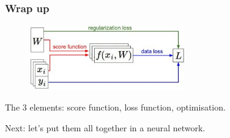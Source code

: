 \begin{frame}
	\frametitle{Wrap up}

	\centering
	\begin{figure}
        	\includegraphics[width=0.6\textwidth]{Pics/dataflow.jpeg}
      	\end{figure}

	The 3 elements: score function, loss function, optimisation.

	Next: let's put them all together in a neural network.

\end{frame}
















